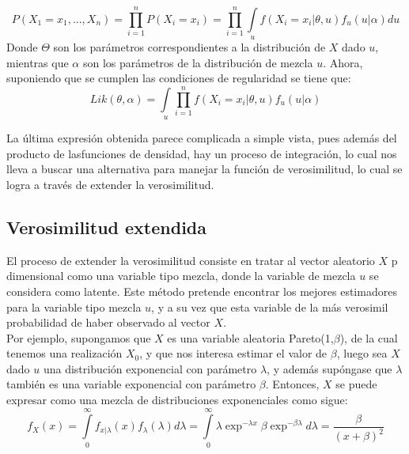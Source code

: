 \documentclass[11pt]{book}
\begin{document}
\begin{equation*}
P(X_{1}=x_{1},..., X_{n})=\prod_{i=1}^{n}P(X_{i}=x_{i})=\prod_{i=1}^{n} \underset{u}{\int } f(X_{i}=x_{i}|\theta,u)f_{u}(u|\alpha)du
\end{equation*}
Donde $\Theta$ son los parámetros correspondientes a la distribución de $X$ dado $u$, mientras que $\alpha$
son los parámetros de la distribución de mezcla $u$.
Ahora, suponiendo que se cumplen las condiciones de regularidad se tiene que:
\begin{equation*}
Lik(\theta,\alpha)= \underset{u}{\int }\prod_{i=1}^{n} f(X_{i}=x_{i}|\theta,u)f_{u}(u|\alpha)
\end{equation*}


La última expresión obtenida parece complicada a simple vista, pues además del producto de lasfunciones de densidad, hay un proceso de integración, lo cual nos lleva a buscar una alternativa para manejar la función de verosimilitud, lo cual se logra a través de extender la verosimilitud.

\subsection*{Verosimilitud extendida}

El proceso de extender la verosimilitud consiste en tratar al vector aleatorio $X$ p dimensional como una variable tipo mezcla, donde la variable de mezcla $u$ se considera como latente. Este método pretende encontrar los mejores estimadores para la variable tipo mezcla $u$, y a su vez que esta variable de la más verosimil probabilidad de haber observado al vector $X$.\\ 

\pagebreak
Por ejemplo, supongamos que $X$ es una variable aleatoria Pareto(1,$\beta$), de la cual tenemos  una realización $X_{0} $, y que nos interesa estimar el valor de $ \beta$, luego sea $X$ dado $u$ una distribución exponencial con parámetro $\lambda$, y además supóngase que $ \lambda$ también es una variable exponencial con parámetro $\beta $. Entonces, $X$ se puede expresar como una mezcla de distribuciones exponenciales como sigue:\\
\begin{equation*}
f_{X}(x)=\underset{0}{\overset{\infty }{\int }}f_{x|\lambda}(x)f_{\lambda}(\lambda)d\lambda=\underset{0}{\overset{\infty }{\int }} \lambda \exp^{-\lambda x} \beta \exp^{-\beta \lambda} d\lambda=\dfrac{\beta}{(x+\beta)^{2}}
\end{equation*}
\end{document}
